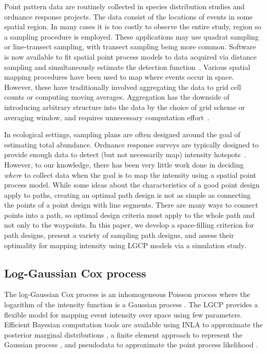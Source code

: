 \documentclass[review]{elsarticle}
\begin{document}
Point pattern data are routinely collected in species distribution studies and
ordnance response projects. The data consist of the locations of events in some
spatial region. In many cases it is too costly to observe the entire study,
region so a sampling procedure is employed. These applications may use quadrat
sampling or line-transect sampling, with transect sampling being more common.
Software is now available to fit spatial point process models to data acquired
via distance sampling and simultaneously estimate the detection
function~\citep{dspat,baser}. Various spatial mapping procedures have been used
to map where events occur in space. However, these have traditionally involved
aggregating the data to grid cell counts or computing moving averages.
Aggregation has the downside of introducing arbitrary structure into the data
by the choice of grid scheme or averaging window, and requires unnecessary
computation effort~\citep{simpsonetal}.

In ecological settings, sampling plans are often designed around the goal of
estimating total abundance. Ordnance response surveys are typically designed
to provide enough data to detect (but not necessarily map) intensity
hotspots~\citep{em200-1-15,flaggetal}. However, to our knowledge, there has
been very little work done in deciding \emph{where} to collect data when the
goal is to map the intensity using a spatial point process model. While some
ideas about the characteristics of a good point design apply to paths, creating
an optimal path design is not as simple as connecting the points of a point
design with line segments. There are many ways to connect points into a path,
so optimal design criteria must apply to the whole path and not only to the
waypoints. In this paper, we develop a space-filling criterion for path
designs, present a variety of sampling path designs, and assess their
optimality for mapping intensity using LGCP models via a simulation study.


\subsection{Log-Gaussian Cox process}

The log-Gaussian Cox process is an inhomogeneous Poisson process where the
logarithm of the intensity function is a Gaussian process \citep{moelleretal}.
The LGCP provides a flexible model for mapping event intensity over space using
few parameters. Efficient Bayesian computation tools are available using INLA
to approximate the posterior marginal distributions \citep{rueetal}, a finite
element approach to represent the Gaussian process \citep{lindgrenetal}, and
pseudodata to approximate the point process likelihood \citep{simpsonetal}.
\end{document}
